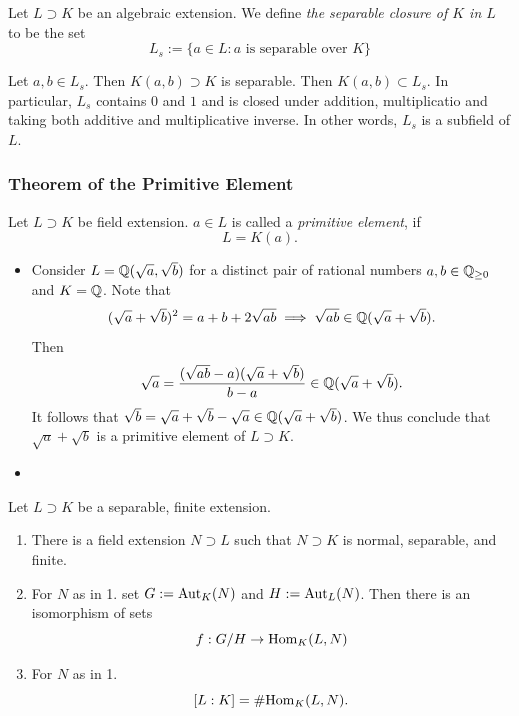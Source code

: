 \begin{definition}
    Let $L\supset K$ be an algebraic extension. We define \emph{the separable closure of $K$ in $L$} to be the set
    $$
        L_s := \{a\in L : a \text{ is separable over } K\}
    $$
\end{definition}
\begin{remark}
    Let $a,b\in L_s$. Then $K(a,b)\supset K$ is separable. Then $K(a,b)\subset L_s$. In particular, $L_s$ contains $0$ and $1$ and is closed under addition, multiplicatio and taking both additive and multiplicative inverse. In other words, $L_s$ is a subfield of $L$.  
\end{remark}

\subsubsection{Theorem of the Primitive Element}
    \begin{definition}
        Let $L\supset K$ be field extension. $a\in L$ is called a \emph{primitive element}, if 
        $$
            L = K(a).
        $$
    \end{definition}
    \begin{example}
        \begin{itemize}
            \item Consider $L=\mathbb{Q}(\sqrt{a},\sqrt{b})$ for a distinct pair of rational numbers $a,b\in \mathbb{Q}_{\geq 0}$ and $K=\mathbb{Q}$. Note that 
            $$
                (\sqrt{a}+\sqrt{b})^2 = a+b+2\sqrt{ab}\implies \sqrt{ab}\in \mathbb{Q}(\sqrt{a}+\sqrt{b}).
            $$
            Then 
            $$
                \sqrt{a} = \frac{(\sqrt{ab}-a)(\sqrt{a}+\sqrt{b})}{b-a}\in \mathbb{Q}(\sqrt{a}+\sqrt{b}).
            $$
            It follows that $\sqrt{b} =\sqrt{a}+\sqrt{b}-\sqrt{a} \in \mathbb{Q}(\sqrt{a}+\sqrt{b})$. We thus conclude that $\sqrt{a}+\sqrt{b}$ is a primitive element of $L\supset K$. 
            \item 
        \end{itemize}
    \end{example}
    \begin{lemma}
    Let $L\supset K$ be a separable, finite extension. 
        \begin{enumerate}
            \item There is a field extension $N\supset L$ such that $N\supset K$ is normal, separable, and finite. 
            \item For $N$ as in 1. set $G := \mathrm{Aut}_K(N)$ and $H := \mathrm{Aut}_L(N)$. Then there is an isomorphism of sets 
            $$
                f : G/H \rightarrow \mathrm{Hom}_K(L,N)
            $$
            \item For $N$ as in 1.
                $$
                    [L : K] = \#\mathrm{Hom}_K(L,N).
                $$
        \end{enumerate}
    \end{lemma}
